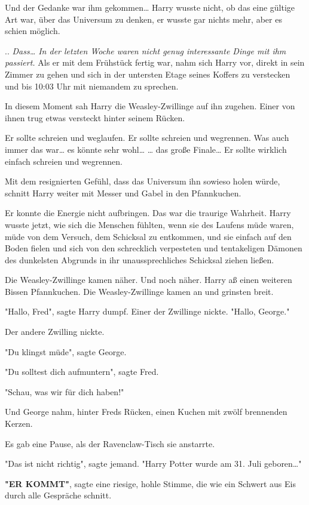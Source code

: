 {Und der Gedanke war ihm gekommen… Harry wusste nicht, ob das eine gültige Art war, über das Universum zu denken, er wusste gar nichts mehr, aber es schien möglich.

.. \emph{Dass… In der letzten Woche waren nicht genug interessante Dinge mit ihm passiert.} Als er mit dem Frühstück fertig war, nahm sich Harry vor, direkt in sein Zimmer zu gehen und sich in der untersten Etage seines Koffers zu verstecken und bis 10:03 Uhr mit niemandem zu sprechen.

In diesem Moment sah Harry die Weasley-Zwillinge auf ihn zugehen. Einer von ihnen trug etwas versteckt hinter seinem Rücken.

Er sollte schreien und weglaufen. Er sollte schreien und wegrennen. Was auch immer das war… es könnte sehr wohl… … das große Finale… Er sollte wirklich einfach schreien und wegrennen.

Mit dem resignierten Gefühl, dass das Universum ihn sowieso holen würde, schnitt Harry weiter mit Messer und Gabel in den Pfannkuchen.

Er konnte die Energie nicht aufbringen. Das war die traurige Wahrheit. Harry wusste jetzt, wie sich die Menschen fühlten, wenn sie des Laufens müde waren, müde von dem Versuch, dem Schicksal zu entkommen, und sie einfach auf den Boden fielen und sich von den schrecklich verpesteten und tentakeligen Dämonen des dunkelsten Abgrunds in ihr unaussprechliches Schicksal ziehen ließen.

Die Weasley-Zwillinge kamen näher. Und noch näher. Harry aß einen weiteren Bissen Pfannkuchen. Die Weasley-Zwillinge kamen an und grinsten breit.

"Hallo, Fred", sagte Harry dumpf. Einer der Zwillinge nickte. "Hallo, George."

Der andere Zwilling nickte.

"Du klingst müde", sagte George.

"Du solltest dich aufmuntern", sagte Fred.

"Schau, was wir für dich haben!"

Und George nahm, hinter Freds Rücken, einen Kuchen mit zwölf brennenden Kerzen.

Es gab eine Pause, als der Ravenclaw-Tisch sie anstarrte.

"Das ist nicht richtig", sagte jemand. "Harry Potter wurde am 31. Juli geboren…"

\textbf{"ER KOMMT"}, sagte eine riesige, hohle Stimme, die wie ein Schwert aus Eis durch alle Gespräche schnitt.

}
